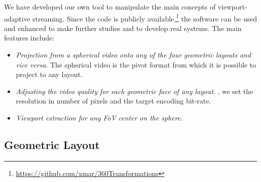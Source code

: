 We have developed our own tool to manipulate the main
concepts of viewport-adaptive streaming. Since the code is publicly
available,\footnote{\url{https://github.com/xmar/360Transformations}}
the software can be used and enhanced to make further studies and to
develop real systems. The main features include:
\begin{itemize}
  \item \emph{Projection from a spherical video onto any of the four geometric
layouts and vice versa}. The spherical video is the pivot format from
which it is possible to project to any layout.

  \item \emph{Adjusting the video quality for each
geometric face of any layout}. , we set the resolution in
number of pixels and the target encoding bit-rate.

  \item \emph{Viewport extraction for any
\ac{FoV} center on the sphere}. 
\end{itemize}

\subsection{Geometric Layout}

